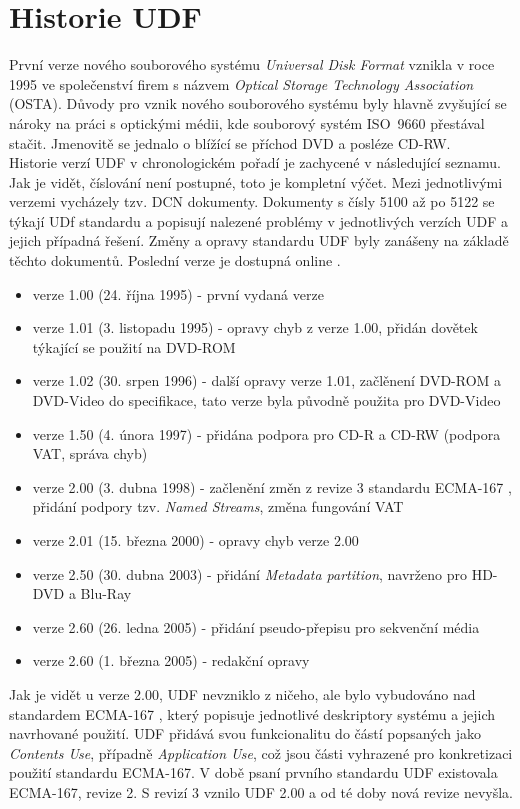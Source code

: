 \section{Historie UDF}
\label{sec:historie-udf}
První verze nového souborového systému \textit{Universal Disk Format} vznikla v roce 1995 ve společenství firem s názvem \textit{Optical Storage Technology Association} (OSTA). Důvody pro vznik nového souborového systému byly hlavně zvyšující se nároky na práci s optickými médii, kde souborový systém ISO~9660 přestával stačit. Jmenovitě se jednalo o blížící se příchod DVD a posléze CD-RW.\\
Historie verzí UDF v chronologickém pořadí je zachycené v následující seznamu. Jak je vidět, číslování není postupné, toto je kompletní výčet. Mezi jednotlivými verzemi vycházely tzv. DCN dokumenty. Dokumenty s čísly 5100 až po 5122 se týkají UDf standardu a popisují nalezené problémy v jednotlivých verzích UDF a jejich případná řešení. Změny a opravy standardu UDF byly zanášeny na základě těchto dokumentů. Poslední verze je dostupná online \cite{dcn}.
\begin{itemize}
    \item verze 1.00 (24. října 1995) - první vydaná verze
    \item verze 1.01 (3. listopadu 1995) - opravy chyb z verze 1.00, přidán dovětek týkající se použití na DVD-ROM
    \item verze 1.02 (30. srpen 1996) - další opravy verze 1.01, začlěnení DVD-ROM a DVD-Video do specifikace, tato verze byla původně použita pro DVD-Video
    \item verze 1.50 (4. února 1997) - přidána podpora pro CD-R a CD-RW (podpora VAT, správa chyb)
    \item verze 2.00 (3. dubna 1998) - začlenění změn z revize 3 standardu ECMA-167 \cite{ecma-167}, přidání podpory tzv. \textit{Named Streams}, změna fungování VAT
    \item verze 2.01 (15. března 2000) - opravy chyb verze 2.00
    \item verze 2.50 (30. dubna 2003) - přidání \textit{Metadata partition}, navrženo pro HD-DVD a Blu-Ray
    \item verze 2.60 (26. ledna 2005) - přidání pseudo-přepisu pro sekvenční média
    \item verze 2.60 (1. března 2005) - redakční opravy
\end{itemize}
Jak je vidět u verze 2.00, UDF nevzniklo z ničeho, ale bylo vybudováno nad standardem ECMA-167 \cite{ecma-167}, který popisuje jednotlivé deskriptory systému a jejich navrhované použití. UDF přidává svou funkcionalitu do částí popsaných jako \textit{Contents Use}, případně \textit{Application Use}, což jsou části vyhrazené pro konkretizaci použití standardu ECMA-167. V době psaní prvního standardu UDF existovala ECMA-167, revize 2. S revizí 3 vznilo UDF 2.00 a od té doby nová revize nevyšla. 

